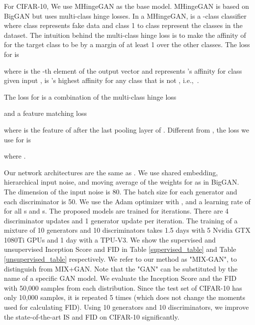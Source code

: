 \documentclass[conference]{IEEEtran}
\newcommand{\ie}{{i.e.,~}}
\begin{document}
For CIFAR-10, We use MHingeGAN\cite{MHGAN} as the base model. MHingeGAN is based on BigGAN\cite{biggan} but uses multi-class hinge losses. In a MHingeGAN,  is a -class classifier where class  represents fake data and class 1 to class  represent the  classes in the dataset. The intuition behind the multi-class hinge loss is to make the affinity of  for the target class to be by a margin of at least 1 over the other classes. The loss for  is

where  is the -th element of the output vector  and represents 's affinity for class  given input ,  is 's highest affinity for any class that is not , \ie .

The loss for  is a combination of the multi-class hinge loss

and a feature matching loss

where  is the feature of  after the last pooling layer of .
Different from \cite{MHGAN}, the loss we use for  is 

where .

Our network architectures are the same as \cite{MHGAN}. We use shared embedding, hierarchical input noise, and moving average of the weights for  as in BigGAN\cite{biggan}. The dimension of the input noise  is 80. The batch size for each generator and each discriminator is 50. We use the Adam optimizer\cite{adam} with ,  and a learning rate of  for all s and s. The proposed models are trained for  iterations. There are 4 discriminator updates and 1 generator update per iteration. The training of a mixture of 10 generators and 10 discriminators takes 1.5 days with 5 Nvidia GTX 1080Ti GPUs and 1 day with a TPU-V3. We show the supervised and unsupervised Inception Score and FID in Table \ref{supervised_table} and Table \ref{unsupervised_table} respectively.  We refer to our method as "MIX-GAN", to distinguish from MIX+GAN. Note that the "GAN" can be substituted by the name of a specific GAN model. We evaluate the Inception Score and the FID with 50,000 samples from each distribution. Since the test set of CIFAR-10 has only 10,000 samples, it is repeated 5 times (which does not change the moments used for calculating FID). Using 10 generators and 10 discriminators, we improve the state-of-the-art IS and FID on CIFAR-10 significantly. 
\end{document}
